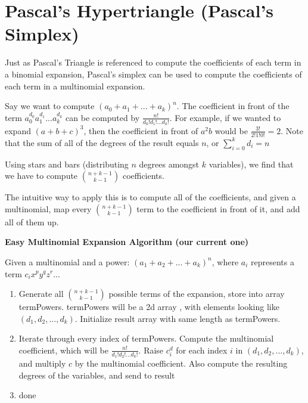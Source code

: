 \documentclass{article}
\begin{document}
\section{Pascal's Hypertriangle (Pascal's Simplex)}
Just as Pascal's Triangle is referenced to compute the coefficients of each term in a binomial expansion, Pascal's simplex can be used to compute the coefficients of each term in a multinomial expansion.

Say we want to compute $(a_0 + a_1 + ... + a_k)^n$. The coefficient in front of the term $a_0^{d_0}a_1^{d_1}...a_k^{d_k}$ can be computed by $\frac{n!}{d_0!d_1!...d_k!}$. For example, if we wanted to expand $(a + b + c)^3$, then the coefficient in front of $a^2 b$ would be $\frac{3!}{2!1!0!}=2$. Note that the sum of all of the degrees of the result equals $n$, or $\sum_{i=0}^{k} d_i=n$

Using stars and bars (distributing $n$ degrees amongst $k$ variables), we find that we have to compute $n + k - 1 \choose k-1$ coefficients.

The intuitive way to apply this is to compute all of the coefficients, and given a multinomial, map every $n + k - 1 \choose k-1$ term to the coefficient in front of it, and add all of them up.

\textbf{Easy Multinomial Expansion Algorithm (our current one)}

Given a multinomial and a power: $(a_1 + a_2 + ... + a_k)^n$, where $a_i$ represents a term $c_ix^py^qz^r...$

\begin{enumerate}
    \item Generate all $\binom{n+k-1}{k-1}$ possible terms of the expansion, store into array termPowers. termPowers will be a 2d array , with elements looking like $(d_1, d_2, ... , d_k)$. Initialize result array with same length as termPowers.
    \item Iterate through every index of termPowers. Compute the multinomial coefficient, which will be $\frac{n!}{d_1!d_2!...d_k!}$. Raise $c^d_i$ for each index $i$ in $(d_1, d_2, ... , d_k)$, and multiply $c$ by the multinomial coefficient. Also compute the resulting degrees of the variables, and send to result
    \item done
\end{enumerate}
\end{document}

